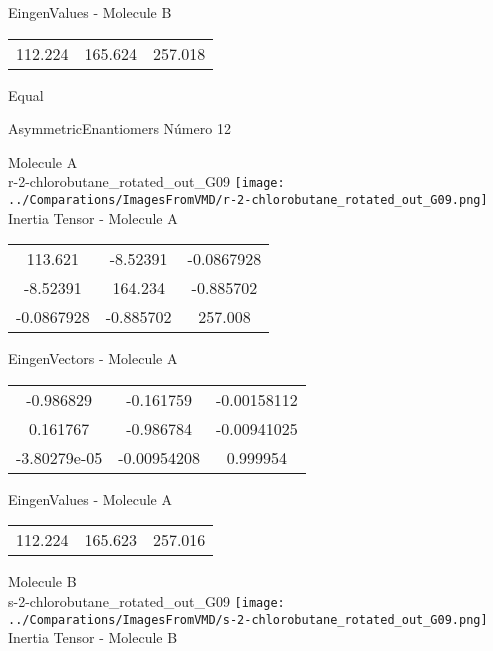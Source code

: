 \begin{multicols}{2}
\begin{center}
\vtab
 EingenValues - Molecule B     \\
\vtab
\begin{tabular}{|c c c|}
112.224	 & 	165.624	 & 	257.018	 \\
\end{tabular}

\end{center}
\end{multicols}
\begin{center}
\vtab
\vtab
\textcolor{NavyBlue}{\Large Equal}
\end{center}

 \newpage

\vtab[-2cm]
\begin{center}
{\large AsymmetricEnantiomers \tab Número 12}
\end{center}
\begin{multicols}{2}
\begin{center}

Molecule A \\ 
r-2-chlorobutane\_rotated\_out\_G09
\texttt{[image: ../Comparations/ImagesFromVMD/r-2-chlorobutane\_rotated\_out\_G09.png]}
\\
Inertia Tensor - Molecule A \\
\vtab

\begin{tabular}{|c c c|}
113.621	 & 	-8.52391	 & 	-0.0867928	 \\
-8.52391	 & 	164.234	 & 	-0.885702	 \\
-0.0867928	 & 	-0.885702	 & 	257.008
\end{tabular}

\vtab
 EingenVectors - Molecule A     \\
\vtab
\begin{tabular}{|c c c|}
-0.986829	 & 	-0.161759	 & 	-0.00158112	 \\
0.161767	 & 	-0.986784	 & 	-0.00941025	 \\
-3.80279e-05	 & 	-0.00954208	 & 	0.999954
\end{tabular}

\vtab
 EingenValues - Molecule A     \\
\vtab
\begin{tabular}{|c c c|}
112.224	 & 	165.623	 & 	257.016	 \\
\end{tabular}
\columnbreak

Molecule B \\ 
s-2-chlorobutane\_rotated\_out\_G09
\texttt{[image: ../Comparations/ImagesFromVMD/s-2-chlorobutane\_rotated\_out\_G09.png]}
\\
Inertia Tensor - Molecule B \\
\vtab


\end{center}
\end{multicols}
